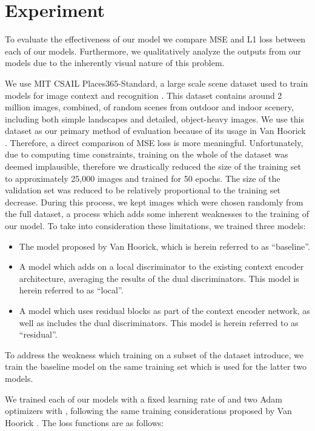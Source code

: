 \documentclass{article}
\begin{document}
\section{Experiment}
To evaluate the effectiveness of our model we compare MSE and L1 loss between each of our models. Furthermore, we qualitatively analyze the outputs from our models due to the inherently visual nature of this problem.

We use MIT CSAIL Places365-Standard, a large scale scene dataset used to train models for image context and recognition \citep{zhou_places_2017}. This dataset contains around 2 million images, combined, of random scenes from outdoor and indoor scenery, including both simple landscapes and detailed, object-heavy images. We use this dataset as our primary method of evaluation because of its usage in Van Hoorick \citep{van_hoorick_image_2020}. Therefore, a direct comparison of MSE loss is more meaningful. Unfortunately, due to computing time constraints, training on the whole of the dataset was deemed implausible, therefore we drastically reduced the size of the training set to approximately 25,000 images and trained for 50 epochs. The size of the validation set was reduced to be relatively proportional to the training set decrease. During this process, we kept images which were chosen randomly from the full dataset, a process which adds some inherent weaknesses to the training of our model. To take into consideration these limitations, we trained three models: 
\begin{itemize}
\setlength{\partopsep}{0pt}
\setlength{\topsep}{0pt}
\setlength{\itemsep}{0pt}
	\item{The model proposed by Van Hoorick, which is herein referred to as ``baseline''.}
	\item{A model which adds on a local discriminator to the existing context encoder architecture, averaging the results of the dual discriminators. This model is herein referred to as ``local''.}
	\item{A model which uses residual blocks as part of the context encoder network, as well as includes the dual discriminators. This model is herein referred to as ``residual''.}
\end{itemize}
To address the weakness which training on a subset of the dataset introduce, we train the baseline model on the same training set which is used for the latter two models.

We trained each of our models with a fixed learning rate of  and two Adam optimizers with , following the same training considerations proposed by Van Hoorick \citep{van_hoorick_image_2020}. The loss functions are as follows:
\end{document}
